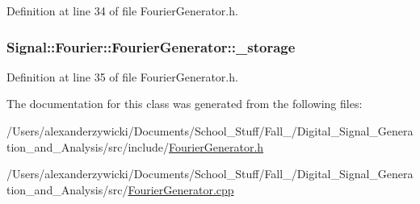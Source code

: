 Definition at line 34 of file Fourier\+Generator.\+h.

\hypertarget{classSignal_1_1Fourier_1_1FourierGenerator_ab6e6b79cf56e31c9a1b5766f357f8cfb}{
\subsubsection[{\+\_\+storage}]{ Signal\+::\+Fourier\+::\+Fourier\+Generator\+::\+\_\+storage\hspace{0.3cm}{\ttfamily [protected]}}}\label{classSignal_1_1Fourier_1_1FourierGenerator_ab6e6b79cf56e31c9a1b5766f357f8cfb}


Definition at line 35 of file Fourier\+Generator.\+h.



The documentation for this class was generated from the following files\+:\begin{DoxyCompactItemize}
\item 
/\+Users/alexanderzywicki/\+Documents/\+School\+\_\+\+Stuff/\+Fall\+\_/\+Digital\+\_\+\+Signal\+\_\+\+Generation\+\_\+and\+\_\+\+Analysis/src/include/\hyperlink{FourierGenerator_8h}{Fourier\+Generator.\+h}\item 
/\+Users/alexanderzywicki/\+Documents/\+School\+\_\+\+Stuff/\+Fall\+\_/\+Digital\+\_\+\+Signal\+\_\+\+Generation\+\_\+and\+\_\+\+Analysis/src/\hyperlink{FourierGenerator_8cpp}{Fourier\+Generator.\+cpp}\end{DoxyCompactItemize}
